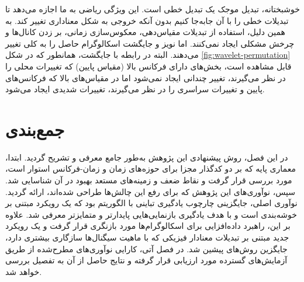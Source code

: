 خوشبختانه، تبدیل موجک یک تبدیل خطی است. این ویژگی ریاضی به ما اجازه می‌دهد تا تبدیلات خطی را با آن جابه‌جا کنیم بدون آنکه خروجی به شکل معناداری تغییر کند. به همین دلیل، استفاده از تبدیلات مقیاس‌دهی، معکوس‌سازی زمانی، بر زدن کانال‌ها و چرخش مشکلی ایجاد نمی‌کنند. اما نویز و جایگشت اسکالوگرام حاصل را به کلی تغییر می‌دهند. البته در رابطه با جایگشت، همانطور که در شکل \ref{fig:wavelet-permutation} قابل مشاهده است،
بخش‌های دارای فرکانس بالا (مقیاس پایین) که تغییرات محلی را در نظر می‌گیرند، تغییر چندانی ایجاد نمی‌شود اما در مقیاس‌های بالا که فرکانس‌های پایین و تغییرات سراسری را در نظر می‌گیرند، تغییرات شدیدی ایجاد می‌شود.

\section{جمع‌بندی}

در این فصل، روش پیشنهادی این پژوهش به‌طور جامع معرفی و تشریح گردید. ابتدا، معماری پایه که بر دو کدگذار مجزا برای حوزه‌های زمان و زمان-فرکانس استوار است، مورد بررسی قرار گرفت و نقاط ضعف و زمینه‌های مستعد بهبود در آن شناسایی شد. سپس، نوآوری‌های این پژوهش که برای رفع این چالش‌ها طراحی شده‌اند، ارائه گردید. نوآوری اصلی، جایگزینی چارچوب یادگیری تباینی  با الگوریتم  بود که یک رویکرد مبتنی بر خوشه‌بندی است و با هدف یادگیری بازنمایی‌هایی پایدارتر و متمایزتر معرفی شد. علاوه بر این، راهبرد داده‌افزایی برای اسکالوگرام‌ها مورد بازنگری قرار گرفت و یک رویکرد جدید مبتنی بر تبدیلات معنادار فیزیکی که با ماهیت سیگنال‌ها سازگاری بیشتری دارد، جایگزین روش‌های پیشین شد. در فصل آتی، کارایی نوآوری‌های مطرح‌شده از طریق آزمایش‌های گسترده مورد ارزیابی قرار گرفته و نتایج حاصل از آن به تفصیل بررسی خواهد شد.
